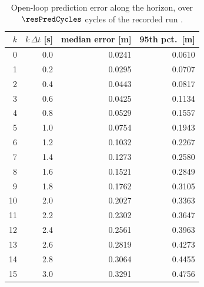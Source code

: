 \begin{table}[htbp]
  \centering
  \small
  \caption{Open-loop prediction error along the horizon, over $\resPredCycles$ cycles of the recorded run \resBag.}
  \label{res:tab:pred}
  \begin{tabular}{rrrr}
    \toprule
    $k$ & $k\,\Delta t$ [s] & median error [m] & 95th pct.\ [m] \\
    \midrule
    0 & 0.0 & 0.0241 & 0.0610 \\
    1 & 0.2 & 0.0295 & 0.0707 \\
    2 & 0.4 & 0.0443 & 0.0817 \\
    3 & 0.6 & 0.0425 & 0.1134 \\
    4 & 0.8 & 0.0529 & 0.1557 \\
    5 & 1.0 & 0.0754 & 0.1943 \\
    6 & 1.2 & 0.1032 & 0.2267 \\
    7 & 1.4 & 0.1273 & 0.2580 \\
    8 & 1.6 & 0.1521 & 0.2849 \\
    9 & 1.8 & 0.1762 & 0.3105 \\
    10 & 2.0 & 0.2027 & 0.3363 \\
    11 & 2.2 & 0.2302 & 0.3647 \\
    12 & 2.4 & 0.2561 & 0.3963 \\
    13 & 2.6 & 0.2819 & 0.4273 \\
    14 & 2.8 & 0.3064 & 0.4455 \\
    15 & 3.0 & 0.3291 & 0.4756 \\
    \bottomrule
  \end{tabular}
\end{table}

